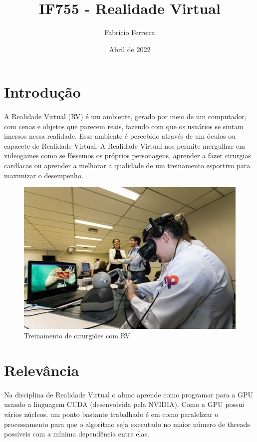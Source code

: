 \documentclass{article}
\title{IF755 - Realidade Virtual}
\author{Fabrício Ferreira}
\date{Abril de 2022}
\begin{document}
\maketitle

\section{Introdução}

\paragraph{} A Realidade Virtual (RV) é um ambiente, gerado por meio de um computador, com cenas e objetos que parecem reais, fazendo com que os usuários se sintam imersos nessa realidade. Esse ambiente é percebido através de um óculos ou capacete de Realidade Virtual. A Realidade Virtual nos permite mergulhar em videogames como se fôssemos os próprios personagens, aprender a fazer cirurgias cardíacas ou aprender a melhorar a qualidade de um treinamento esportivo para maximizar o desempenho. \cite{iberdrolaRV}

\begin{figure}[h!]
    \centering
    \includegraphics[scale=0.8]{Cirurgia RV.jpg}
    \caption{Treinamento de cirurgiões com RV \cite{cirurgioesRV}}
    \label{RVimg}
\end{figure}

\newpage

\section{Relevância}

\paragraph{} Na disciplina de Realidade Virtual o aluno aprende como programar para a GPU usando a linguagem CUDA (desenvolvida pela NVIDIA). Como a GPU possui vários núcleos, um ponto bastante trabalhado é em como paralelizar o processamento para que o algoritmo seja executado no maior número de threads possíveis com a mínima dependência entre elas. \cite{wikiRel}
\end{document}
